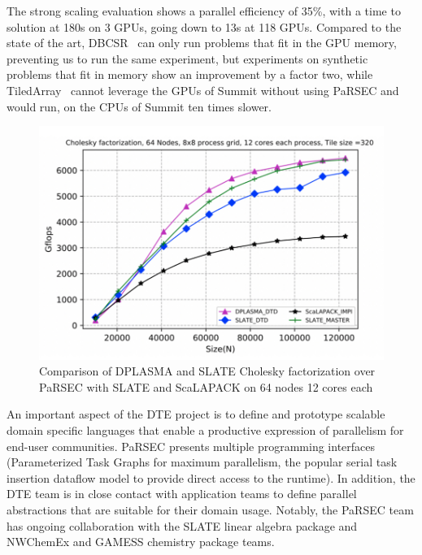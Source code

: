 The strong scaling evaluation shows a parallel efficiency of 35\%,
with a time to solution at 180s on 3 GPUs, going down to 13s at 118
GPUs.
Compared to the state of the art, DBCSR~\cite{parsec::dbcsr} can only
run problems that fit in the GPU memory, preventing us to run the same
experiment, but experiments on synthetic problems that fit in memory
show an improvement by a factor two, while
TiledArray~\cite{parsec::tiledarray} cannot leverage the GPUs of
Summit without using PaRSEC and would run, on the CPUs of Summit ten
times slower.
%
%
\begin{figure}
\vspace*{-1.5em}\centering\includegraphics[scale=0.50]{projects/2.3.1-PMR/2.3.1.09-ParSEC/slate_updated_nacl.pdf}
  \caption{Comparison of DPLASMA and SLATE Cholesky factorization over PaRSEC with
           SLATE and ScaLAPACK on 64 nodes 12 cores each\label{fig:slate-parsec}}
\end{figure}

An important aspect of the DTE project is to define and prototype scalable
domain specific languages that enable a productive expression of parallelism for
end-user communities. PaRSEC presents multiple programming interfaces
(Parameterized Task Graphs for maximum parallelism, the popular serial task
insertion dataflow model to provide direct access to the runtime). In addition,
the DTE team is in close contact with application teams to define parallel
abstractions that are suitable for their domain usage. Notably, the PaRSEC team
has ongoing collaboration with the SLATE linear algebra package and NWChemEx and
GAMESS chemistry package teams.


